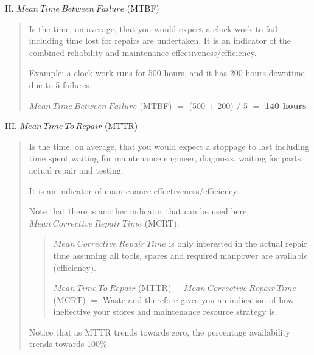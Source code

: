 II. $Mean~Time~Between~Failure$ (MTBF) 

\begin{quote}
Is the time, on average, that you would expect a clock-work to fail including time lost for repairs are undertaken. It is an indicator of the combined reliability and maintenance effectiveness/efficiency.

Example: a clock-work runs for 500 hours, and it has 200 hours downtime due to 5 failures.

$Mean~Time~Between~Failure$ (MTBF) $=$ (500 $+$ 200) $/$ 5 $=$ \textbf{140 hours}                               \end{quote} 

III. $Mean~Time~To~Repair$ (MTTR) 

\begin{quote}
Is the time, on average, that you would expect a stoppage to last including time spent waiting for maintenance engineer, diagnosis, waiting for parts, actual repair and testing. 

It is an indicator of maintenance effectiveness/efficiency. 

Note that there is another indicator that can be used here, $Mean~Corrective~Repair~Time$ (MCRT). 
\begin{quote}
$Mean~Corrective~Repair~Time$ is only interested in the actual repair time assuming all tools, spares and required manpower are available (efficiency).

$Mean~Time~To~Repair$ (MTTR) $-$  $Mean~Corrective~Repair~Time$ (MCRT)  $=$  Waste and therefore gives you an indication of how ineffective your stores and maintenance resource strategy is.                                                                                                                                                                                                                                                                                                                                                                                                                                                                                                                                                                                                        \end{quote} 

Notice that as MTTR trends towards zero, the percentage availability trends towards 100\%.

\end{quote}

